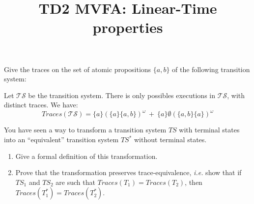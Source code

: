 \documentclass[11pt,a4paper]{article}
\title{TD2 MVFA: Linear-Time properties} %
\date{}
\def\ts{\mathcal{TS}}
\def\traces{\mathit{Traces}}
\def\seta{\{a\}}
\def\setab{\{a,b\}}
\begin{document}
\maketitle

\begin{Exercise}

Give the traces on the set of atomic propositions $\{a,b\}$ of the following transition system:

\begin{center}
\end{center}
\end{Exercise}

\begin{Answer}

Let $\ts$ be the transition system. There is only possibles executions in $\ts$, with distinct traces.%
We have:
$$\traces(\ts)=\seta{(\seta\setab)}^\omega\ +\ \seta\emptyset{(\setab\seta)}^\omega$$
\end{Answer}

\begin{Exercise}

You have seen a way to transform a transition system $TS$ with terminal states into an ``equivalent'' transition system $TS^*$ without terminal states.

\begin{enumerate}
	\item Give a formal definition of this transformation.
	\item Prove that the transformation preserves trace-equivalence, \textit{i.e.} show that if $TS_1$ and $TS_2$ are such that $Traces(T_1) = Traces(T_2)$, then $Traces(T_1^*) = Traces(T_2^*)$.
\end{enumerate}
\end{Exercise}
\end{document}
